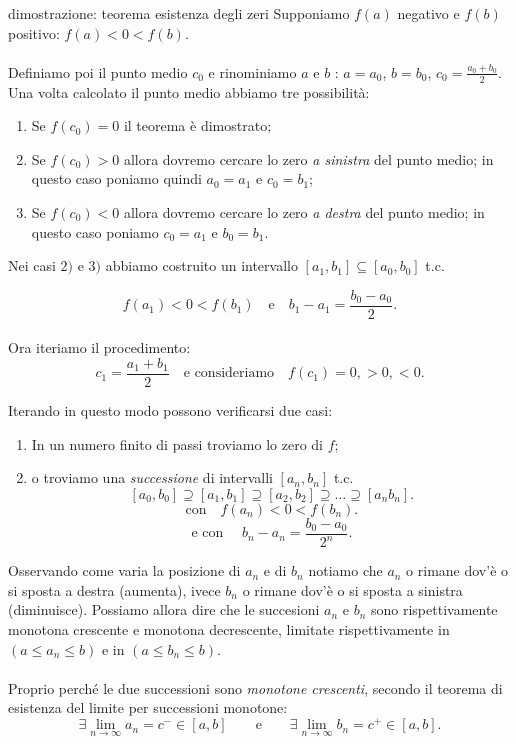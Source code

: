 \documentclass[x11names]{article}
\begin{document}
\begin{es}{dimostrazione: teorema esistenza degli zeri}
Supponiamo $f\left(a\right)$ negativo e $f\left(b\right)$ positivo: $f\left(a\right) < 0 < f\left(b\right)$. 
\\ \\
Definiamo poi il punto medio $c_0$ e rinominiamo $a$ e  $b$ : $a = a_0$, $b = b_0$, $c_0=\frac{a_0+b_0}{2}$.
\\
\noindent
Una volta calcolato il punto medio abbiamo tre possibilità:
\begin{enumerate}
	\item Se $f\left(c_0\right) = 0$ il teorema è dimostrato;
	\item Se $f\left(c_0\right) > 0$ allora dovremo cercare lo zero \textit{a sinistra} del punto medio; in questo caso poniamo quindi $a_0 = a_1$ e $c_0=b_1$;
	\item Se $f\left(c_0\right) < 0$ allora dovremo cercare lo zero \textit{a destra} del punto medio; in questo caso poniamo $c_0= a_1$ e $b_0 = b_1$.
\end{enumerate}

\begin{center}

\end{center}
Nei casi $2)$ e $3)$ abbiamo costruito un intervallo  $\left[a_1,b_1\right] \subseteq \left[a_0,b_0\right]$ t.c. 

\[
f\left(a_1\right)<0<f\left(b_1\right) \quad \text{e} \quad b_1-a_1 = \frac{b_0-a_0}{2}
.\] 
\\
\noindent
Ora iteriamo il procedimento:
\[
	c_1 = \frac{a_1+b_1}{2} \quad \text{e consideriamo} \quad f\left(c_1\right) = 0, > 0, < 0
.\] 

Iterando in questo modo possono verificarsi due casi:
\begin{enumerate}
	\item In un numero finito di passi troviamo lo zero di $f$;
	\item o troviamo una \textit{successione} di intervalli $\left[a_{n},b_{n}\right]$ t.c.
		 \[
		\left[a_0,b_0\right] \supseteq \left[a_1,b_1\right] \supseteq \left[a_2,b_2\right] \supseteq \dots \supseteq\left[a_{n}b_{n}\right]
		.\] 
		\[
			\text{con} \quad f\left(a_{n}\right) < 0 < f\left(b_{n}\right)
		.\] 
		\[
		\text{e con } \quad b_{n} - a_{n} = \frac{b_0-a_0}{2^n}
		.\] 
\end{enumerate}

Osservando come varia la posizione di $a_{n}$ e di $b_{n}$ notiamo che $a_{n}$ o rimane dov'è o si sposta a destra (aumenta), ivece $b_{n}$ o rimane dov'è o si sposta a sinistra (diminuisce). Possiamo allora dire che le succesioni ${a_{n}}$ e ${b_{n}}$ sono rispettivamente monotona crescente e monotona decrescente, limitate rispettivamente in $\left(a \leq a_{n} \leq b\right)$ e in $\left(a \leq b_{n} \leq b\right)$.
\\ \\
Proprio perché le due successioni sono \textit{monotone crescenti}, secondo il teorema di esistenza del limite per successioni monotone:
\[
	\exists \lim_{n\to \infty}a_{n} = c^- \in \left[a,b\right] \qquad \text{e} \qquad \exists\lim_{n\to \infty}b_{n} =c^+ \in \left[a,b\right]
.\] 

\end{es}
\end{document}
